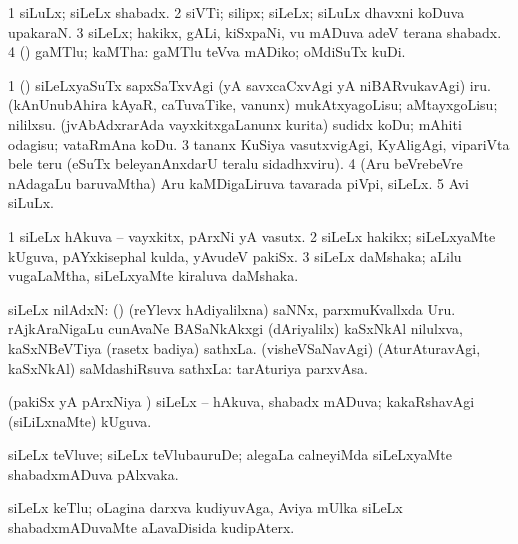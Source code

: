 {{{{{{\bentry
{}
\gl{\nA}
\expl{}
\bmng
\bnum
\num{1} siLuLx; siLeLx shabadx. 
\num{2} siVTi; silipx; siLeLx; siLuLx dhavxni koDuva upakaraN. 
\num{3} siLeLx; hakikx, gALi, kiSxpaNi, \mo vu mADuva adeV terana shabadx. 
\num{4} (\AmA) gaMTlu; kaMTha:  gaMTlu teVva mADiko; oMdiSuTx kuDi. 
\enum
\emng

\noindent 
\gl{\pagu}
\bmng
\bnum
\num{1}  ()  siLeLxyaSuTx sapxSaTxvAgi (yA savxcaCxvAgi yA niBARvukavAgi) iru. 
  
\banum
{} (kAnUnubAhira kAyaR, caTuvaTike, \mo vanunx) mukAtxyagoLisu; aMtayxgoLisu; nililxsu. 
 (jvAbAdxrarAda vayxkitxgaLanunx kurita) sudidx koDu; mAhiti odagisu; vataRmAna koDu. 
\eanum
\numie
\num{3}  tananx KuSiya vasutxvigAgi, KyAligAgi, vipariVta bele teru (eSuTx beleyanAnxdarU teralu sidadhxviru). 
\num{4}  (Aru beVrebeVre nAdagaLu baruvaMtha) Aru kaMDigaLiruva tavarada piVpi, siLeLx. 
\num{5}  Avi siLuLx. 
\enum
\emng
\eentry

\bentry 
{}
\gl{\nA}
\bmng
\bnum
\num{1} siLeLx hAkuva -- vayxkitx, pArxNi yA vasutx. 
\num{2} siLeLx hakikx; siLeLxyaMte kUguva, pAYxkisephal kulda, yAvudeV pakiSx. 
\num{3} siLeLx daMshaka; aLilu \mo vugaLaMtha, siLeLxyaMte kiraluva daMshaka. 
\enum
\emng
\eentry

\bentry
{} 
\gl{\nA}
\expl{}
\bmng
siLeLx nilAdxN: 
\banum
{} (\ame) (reYlevx hAdiyalilxna) saNNx, parxmuKvallxda Uru. 
 rAjkAraNigaLu cunAvaNe BASaNkAkxgi (dAriyalilx) kaSxNkAl nilulxva, kaSxNBeVTiya (rasetx badiya) sathxLa. 
 (visheVSaNavAgi) (AturAturavAgi, kaSxNkAl) saMdashiRsuva sathxLa:  tarAturiya parxvAsa. 
\eanum
\emng
\eentry

\bentry
{} 
\gl{\gu}
\expl{}
\bmng
(pakiSx yA pArxNiya \vi) siLeLx -- hAkuva, shabadx mADuva; kakaRshavAgi (siLiLxnaMte) kUguva. 
\emng
\eentry

\bentry
{} 
\gl{\nA}
\expl{}
\bmng
siLeLx teVluve; siLeLx teVlubauruDe; alegaLa calneyiMda siLeLxyaMte shabadxmADuva pAlxvaka. 
\emng
\eentry

\bentry
{}
\gl{\nA}
\bmng
siLeLx keTlu; oLagina darxva kudiyuvAga, Aviya mUlka siLeLx shabadxmADuvaMte aLavaDisida kudipAterx. 
\emng
\eentry

}}}}}}
